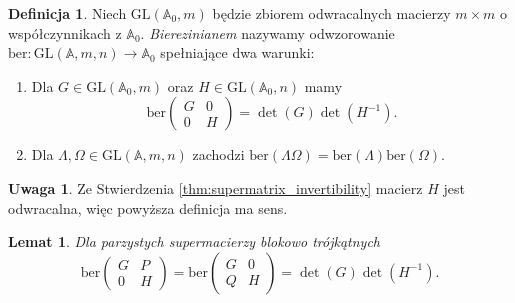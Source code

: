 \documentclass[11pt,a4paper]{report}
\newtheorem{lemma}[theorem]{Lemat}
\theoremstyle{definition}
\newtheorem{definition}[theorem]{Definicja}
\newtheorem{remark}[theorem]{Uwaga}
\newcommand{\ber}{\mathrm{ber}}
\begin{document}
\begin{definition}
\label{def:berezinian}
 Niech $\mathrm{GL}(\mathbb{A}_0,m)$ będzie zbiorem odwracalnych macierzy $m \times m$ o współczynnikach z $\mathbb{A}_0$. \textit{Bierezinianem} nazywamy odwzorowanie $\ber: \mathrm{GL}(\mathbb{A},m,n) \rightarrow \mathbb{A}_0$ spełniające dwa warunki:
 \begin{enumerate}[(1)]
  \item Dla $G \in \mathrm{GL}(\mathbb{A}_0,m)$ oraz $H \in \mathrm{GL}(\mathbb{A}_0,n)$ mamy $$\ber \left( \begin{matrix}
      G & 0 \\
      0 & H
     \end{matrix} \right) = \det(G) \det(H^{-1}).$$
  \item Dla $\Lambda, \Omega \in \mathrm{GL}(\mathbb{A},m,n)$ zachodzi $\ber(\Lambda \Omega) = \ber(\Lambda) \ber(\Omega).$
 \end{enumerate}
\end{definition}

\begin{remark}
 Ze Stwierdzenia \ref{thm:supermatrix_invertibility} macierz $H$ jest odwracalna, więc powyższa definicja ma sens.
\end{remark}

\begin{lemma}
\label{lem:even_ber}
 Dla parzystych supermacierzy blokowo trójkątnych $$\ber \left( \begin{matrix}
      G & P \\
      0 & H
     \end{matrix} \right) = \ber \left( \begin{matrix}
      G & 0 \\
      Q & H
     \end{matrix} \right) = \det(G)\det(H^{-1}).$$
\end{lemma}
\end{document}
